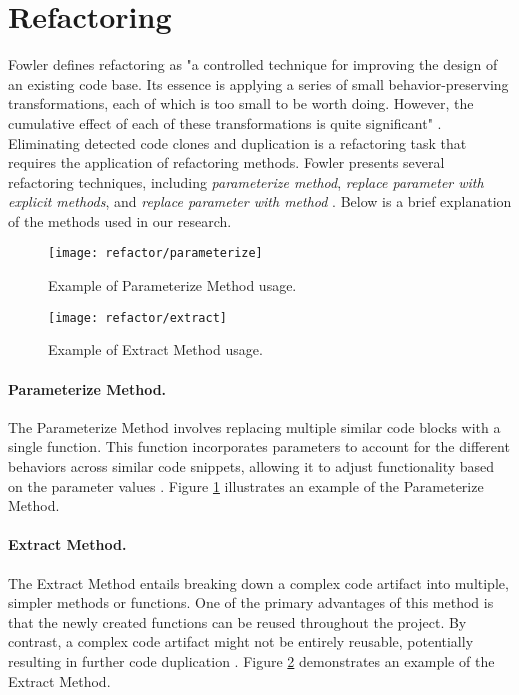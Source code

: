 \en

\section{Refactoring}

Fowler defines refactoring as "a controlled technique for improving the design
of an existing code base. Its essence is applying a series of small
behavior-preserving transformations, each of which is too small to be worth
doing. However, the cumulative effect of each of these transformations is quite
significant" \citep{refactorbook}. Eliminating detected code clones and
duplication is a refactoring task that requires the application of refactoring
methods. Fowler presents several refactoring techniques, including
\textit{parameterize method}, \textit{replace parameter with explicit methods},
and \textit{replace parameter with method} \citep{refactorbook}. Below is a
brief explanation of the methods used in our research.

\begin{figure}[ht]
\texttt{[image: refactor/parameterize]}
\caption{Example of Parameterize Method usage.}
\label{fig:parameter}
\end{figure}


\begin{figure}[ht]
\texttt{[image: refactor/extract]}
\caption{Example of Extract Method usage.}
\label{fig:extract}
\end{figure}

\paragraph{Parameterize Method.}

The Parameterize Method involves replacing multiple similar code blocks with a
single function. This function incorporates parameters to account for the
different behaviors across similar code snippets, allowing it to adjust
functionality based on the parameter values \citep{refactorbook}. Figure
\ref{fig:parameter} illustrates an example of the Parameterize Method.

\paragraph{Extract Method.}

The Extract Method entails breaking down a complex code artifact into multiple,
simpler methods or functions. One of the primary advantages of this method is
that the newly created functions can be reused throughout the project. By
contrast, a complex code artifact might not be entirely reusable, potentially
resulting in further code duplication \citep{refactorbook}. Figure
\ref{fig:extract} demonstrates an example of the Extract Method.

